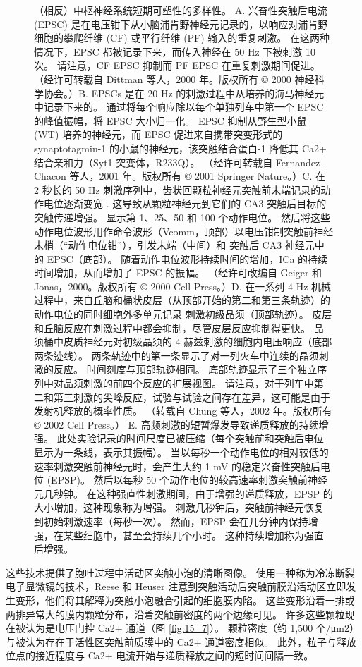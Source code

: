\begin{figure}[htbp]
	\caption{（相反）中枢神经系统短期可塑性的多样性。 A. 兴奋性突触后电流 (EPSC) 是在电压钳下从小脑浦肯野神经元记录的，以响应对浦肯野细胞的攀爬纤维 (CF) 或平行纤维 (PF) 输入的重复刺激。 在这两种情况下，EPSC 都被记录下来，而传入神经在 50 Hz 下被刺激 10 次。 请注意，CF EPSC 抑制而 PF EPSC 在重复刺激期间促进。 （经许可转载自 Dittman 等人，2000 年。版权所有 © 2000 神经科学协会。）B. EPSCs 是在 20 Hz 的刺激过程中从培养的海马神经元中记录下来的。 通过将每个响应除以每个单独列车中第一个 EPSC 的峰值振幅，将 EPSC 大小归一化。 EPSC 抑制从野生型小鼠 (WT) 培养的神经元，而 EPSC 促进来自携带突变形式的 synaptotagmin-1 的小鼠的神经元，该突触结合蛋白-1 降低其 Ca2+ 结合亲和力（Syt1 突变体，R233Q）。 （经许可转载自 Fernandez-Chacon 等人，2001 年。版权所有 © 2001 Springer Nature。）C. 在 2 秒长的 50 Hz 刺激序列中，齿状回颗粒神经元突触前末端记录的动作电位逐渐变宽 . 这导致从颗粒神经元到它们的 CA3 突触后目标的突触传递增强。 显示第 1、25、50 和 100 个动作电位。 然后将这些动作电位波形用作命令波形（Vcomm，顶部）以电压钳制突触前神经末梢（“动作电位钳”），引发末端（中间）和 突触后 CA3 神经元中的 EPSC（底部）。 随着动作电位波形持续时间的增加，ICa 的持续时间增加，从而增加了 EPSC 的振幅。 （经许可改编自 Geiger 和 Jonas，2000。版权所有 © 2000 Cell Press。）D. 在一系列 4 Hz 机械过程中，来自丘脑和桶状皮层（从顶部开始的第二和第三条轨迹）的动作电位的同时细胞外多单元记录 刺激初级晶须（顶部轨迹）。 皮层和丘脑反应在刺激过程中都会抑制，尽管皮层反应抑制得更快。 晶须桶中皮质神经元对初级晶须的 4 赫兹刺激的细胞内电压响应（底部两条迹线）。 两条轨迹中的第一条显示了对一列火车中连续的晶须刺激的反应。 时间刻度与顶部轨迹相同。 底部轨迹显示了三个独立序列中对晶须刺激的前四个反应的扩展视图。 请注意，对于列车中第二和第三刺激的尖峰反应，试验与试验之间存在差异，这可能是由于发射机释放的概率性质。 （转载自 Chung 等人，2002 年。版权所有 © 2002 Cell Press。） E. 高频刺激的短暂爆发导致递质释放的持续增强。 此处实验记录的时间尺度已被压缩（每个突触前和突触后电位显示为一条线，表示其振幅）。 当以每秒一个动作电位的相对较低的速率刺激突触前神经元时，会产生大约 1 mV 的稳定兴奋性突触后电位 (EPSP)。 然后以每秒 50 个动作电位的较高速率刺激突触前神经元几秒钟。 在这种强直性刺激期间，由于增强的递质释放，EPSP 的大小增加，这种现象称为增强。 刺激几秒钟后，突触前神经元恢复到初始刺激速率（每秒一次）。 然而，EPSP 会在几分钟内保持增强，在某些细胞中，甚至会持续几个小时。 这种持续增加称为强直后增强。}
	\label{fig:15_15}
\end{figure}


这些技术提供了胞吐过程中活动区突触小泡的清晰图像。 
使用一种称为冷冻断裂电子显微镜的技术，Reese 和 Heuser 注意到突触活动后突触前膜沿活动区立即发生变形，他们将其解释为突触小泡融合引起的细胞膜内陷。 
这些变形沿着一排或两排异常大的膜内颗粒分布，沿着突触前密度的两个边缘可见。 
许多这些颗粒现在被认为是电压门控 Ca2+ 通道（图 \ref{fig:15_7}）。 
颗粒密度（约 1,500 个/μm2）与被认为存在于活性区突触前质膜中的 Ca2+ 通道密度相似。 
此外，粒子与释放位点的接近程度与 Ca2+ 电流开始与递质释放之间的短时间间隔一致。

